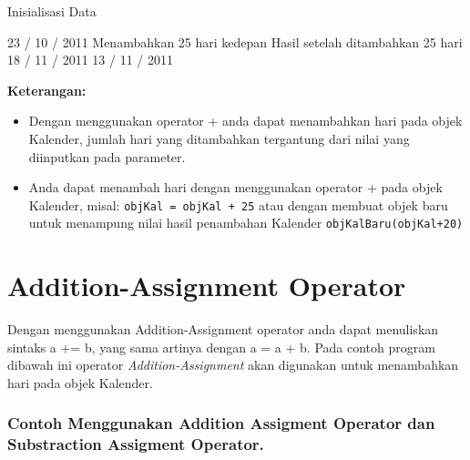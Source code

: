 \begin{lcverbatim}
Inisialisasi Data

23 / 10 / 2011 Menambahkan 25 hari kedepan
Hasil setelah ditambahkan 25 hari 18 / 11 / 2011 
13 / 11 / 2011
\end{lcverbatim}

\textbf{Keterangan:}

\begin{itemize}
\tightlist
\item
  Dengan menggunakan operator + anda dapat menambahkan hari pada objek
  Kalender, jumlah hari yang ditambahkan tergantung dari nilai yang
  diinputkan pada parameter.
\item
  Anda dapat menambah hari dengan menggunakan operator + pada objek
  Kalender, misal: \texttt{objKal\ =\ objKal\ +\ 25} atau dengan membuat
  objek baru untuk menampung nilai hasil penambahan Kalender
  \texttt{objKalBaru(objKal+20)}
\end{itemize}

\section{Addition-Assignment
Operator}\label{addition-assignment-operator}

Dengan menggunakan Addition-Assignment operator anda dapat menuliskan
sintaks a += b, yang sama artinya dengan a = a + b. Pada contoh program
dibawah ini operator \emph{Addition-Assignment} akan digunakan untuk
menambahkan hari pada objek Kalender.

\subsubsection*{Contoh  Menggunakan Addition Assigment Operator dan Substraction Assigment Operator.}


